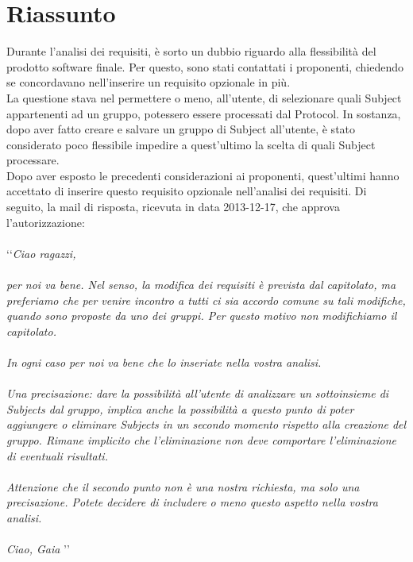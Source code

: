 \section{Riassunto}
\label{riassunto}
Durante l'analisi dei requisiti, è sorto un dubbio riguardo alla flessibilità del prodotto software finale. Per questo, sono stati contattati i proponenti, chiedendo se concordavano nell'inserire un requisito opzionale in più.
\\La questione stava nel permettere o meno, all'utente, di selezionare quali Subject\glossario{} appartenenti ad un gruppo, potessero essere processati dal Protocol\glossario{}. In sostanza, dopo aver fatto creare e salvare un gruppo di Subject\glossario{} all'utente, è stato considerato poco flessibile impedire a quest'ultimo la scelta di quali Subject\glossario{} processare.
\\Dopo aver esposto le precedenti considerazioni ai proponenti, quest'ultimi hanno accettato di inserire questo requisito opzionale nell'analisi dei requisiti. Di seguito, la mail di risposta, ricevuta in data 2013-12-17, che approva l'autorizzazione:
\\ \\ \lq\lq \textit{Ciao ragazzi,}
\\ \\\textit{per noi va bene. Nel senso, la modifica dei requisiti è prevista dal capitolato, ma preferiamo che per venire incontro a tutti ci sia accordo comune su tali modifiche, quando sono proposte da uno dei gruppi. Per questo motivo non modifichiamo il capitolato.}
\\ \\\textit{In ogni caso per noi va bene che lo inseriate nella vostra analisi.}
\\ \\\textit{Una precisazione: dare la possibilità all'utente di analizzare un sottoinsieme di Subjects\glossario{} dal gruppo, implica anche la possibilità a questo punto di poter aggiungere o eliminare Subjects\glossario{} in un secondo momento rispetto alla creazione del gruppo. Rimane implicito che l'eliminazione non deve comportare l'eliminazione di eventuali risultati.} 
\\ \\\textit{Attenzione che il secondo punto non è una nostra richiesta, ma solo una precisazione. Potete decidere di includere o meno questo aspetto nella vostra analisi.} 
\\ \\\textit{Ciao,
Gaia} \rq\rq
